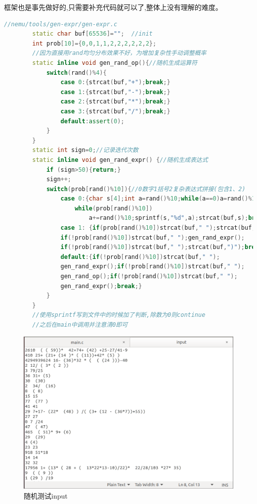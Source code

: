 \documentclass[UTF8,a4paper,10pt]{ctexart}
\begin{document}
{    框架也是事先做好的,只需要补充代码就可以了,整体上没有理解的难度。
    \begin{lstlisting}[title=随机测试,frame=trbl,language={C++}]
        //nemu/tools/gen-expr/gen-expr.c
        static char buf[65536]="";  //init
        int prob[10]={0,0,1,1,2,2,2,2,2,2};
        //因为直接用rand均匀分布效果不好，为增加复杂性手动调整概率
        static inline void gen_rand_op(){//随机生成运算符
            switch(rand()%4){
                case 0:{strcat(buf,"+");break;}
                case 1:{strcat(buf,"-");break;}
                case 2:{strcat(buf,"*");break;}
                case 3:{strcat(buf,"/");break;}
                default:assert(0);
            } 
        }
        static int sign=0;//记录迭代次数
        static inline void gen_rand_expr() {//随机生成表达式
            if (sign>50){return;}
            sign++;
            switch(prob[rand()%10]){//0数字1括号2复杂表达式拼接(包含1、2)
                case 0:{char s[4];int a=rand()%10;while(a==0)a=rand()%10;
                    while(prob[rand()%10]) 
                        a+=rand()%10;sprintf(s,"%d",a);strcat(buf,s);break;}
                case 1: {if(prob[rand()%10])strcat(buf," ");strcat(buf,"(");
                if(!prob[rand()%10])strcat(buf," ");gen_rand_expr();
                if(!prob[rand()%10])strcat(buf," ");strcat(buf,")");break;}
                default:{if(!prob[rand()%10])strcat(buf," ");
                gen_rand_expr();if(!prob[rand()%10])strcat(buf," ");
                gen_rand_op();if(!prob[rand()%10])strcat(buf," ");
                gen_rand_expr();break;}
            }
        }
        //使用sprintf写到文件中的时候加了判断,除数为0则continue
        //之后在main中调用并注意清0即可
    \end{lstlisting}
    \begin{figure}[H]
        \centering
        \includegraphics[scale=0.45]{fig/9.png}
        \caption{随机测试input}
    \end{figure}

}
\end{document}
